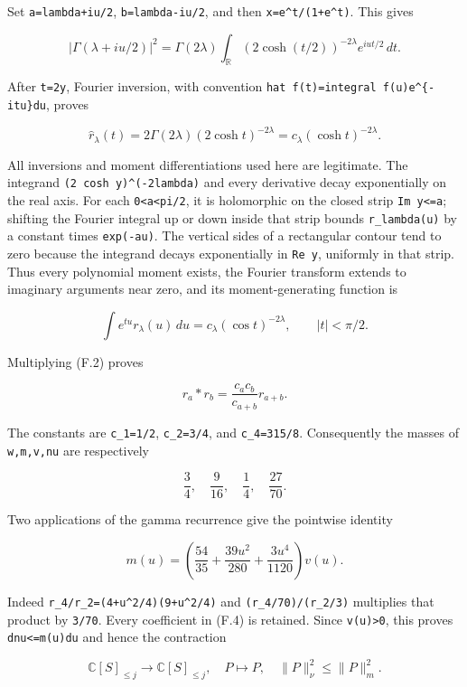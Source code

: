 Set \nolinkurl{a=lambda+iu/2}, \nolinkurl{b=lambda-iu/2}, and then \texttt{x=e\^{}t/(1+e\^{}t)}. This gives

\[
|\Gamma(\lambda+iu/2)|^2
=\Gamma(2\lambda)\int_\mathbb R
       (2\cosh(t/2))^{-2\lambda}e^{iut/2}\,dt.
\]

After \nolinkurl{t=2y}, Fourier inversion, with convention \texttt{hat\ f(t)=integral\ f(u)e\^{}\{-itu\}du}, proves

\[
\widehat r_\lambda(t)
=2\Gamma(2\lambda)(2\cosh t)^{-2\lambda}
=c_\lambda(\cosh t)^{-2\lambda}.
\tag{F.2}
\]

All inversions and moment differentiations used here are legitimate. The integrand \texttt{(2\ cosh\ y)\^{}(-2lambda)} and every derivative decay exponentially on the real axis. For each \texttt{0\textless{}a\textless{}pi/2}, it is holomorphic on the closed strip \texttt{\textbar{}Im\ y\textbar{}\textless{}=a}; shifting the Fourier integral up or down inside that strip bounds \nolinkurl{r_lambda(u)} by a constant times \texttt{exp(-a\textbar{}u\textbar{})}. The vertical sides of a rectangular contour tend to zero because the integrand decays exponentially in \texttt{\textbar{}Re\ y\textbar{}}, uniformly in that strip. Thus every polynomial moment exists, the Fourier transform extends to imaginary arguments near zero, and its moment-generating function is

\[
\int e^{tu}r_\lambda(u)\,du=c_\lambda(\cos t)^{-2\lambda},
\qquad |t|<\pi/2.
\]

Multiplying (F.2) proves

\[
r_a*r_b=\frac{c_ac_b}{c_{a+b}}r_{a+b}.
\]

The constants are \nolinkurl{c_1=1/2}, \nolinkurl{c_2=3/4}, and \nolinkurl{c_4=315/8}. Consequently the masses of \nolinkurl{w,m,v,nu} are respectively

\[
\boxed{\frac34,\quad\frac9{16},\quad\frac14,\quad\frac{27}{70}.}
\tag{F.3}
\]

Two applications of the gamma recurrence give the pointwise identity

\[
m(u)=\left(\frac{54}{35}+\frac{39u^2}{280}
                       +\frac{3u^4}{1120}\right)v(u).
\tag{F.4}
\]

Indeed \texttt{r\_4/r\_2=(4+u\^{}2/4)(9+u\^{}2/4)} and \nolinkurl{(r_4/70)/(r_2/3)} multiplies that product by \nolinkurl{3/70}. Every coefficient in (F.4) is retained. Since \texttt{v(u)\textgreater{}0}, this proves \texttt{dnu\textless{}=m(u)du} and hence the contraction

\[
\mathbb C[S]_{\le j}\longrightarrow\mathbb C[S]_{\le j},
\quad P\longmapsto P,
\quad \|P\|_\nu^2\le\|P\|_m^2.
\tag{F.5}
\]

